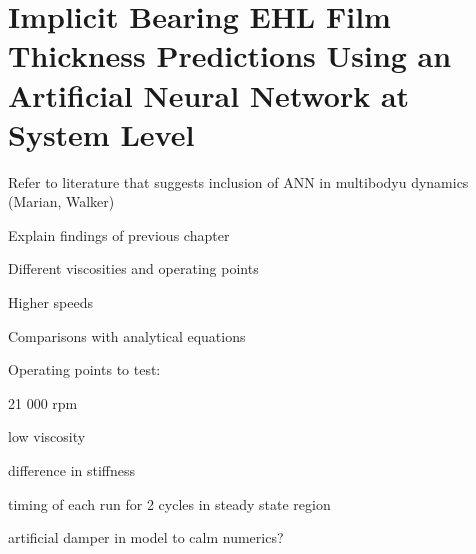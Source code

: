 \chapter{Implicit Bearing EHL Film Thickness Predictions Using an Artificial Neural Network at System Level}
\label{ANN System Level}



Refer to literature that suggests inclusion of ANN in multibodyu dynamics (Marian, Walker)

Explain findings of previous chapter


Different viscosities and operating points

Higher speeds

Comparisons with analytical equations


Operating points to test:

21 000 rpm

low viscosity 

difference in stiffness

timing of each run for 2 cycles in steady state region

artificial damper in model to calm numerics?